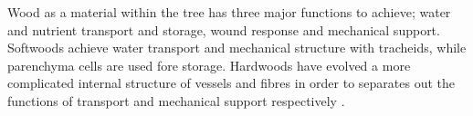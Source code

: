 Wood as a material within the tree has three major functions to achieve; water
and nutrient transport and storage, wound response and mechanical support. Softwoods
achieve water transport and mechanical structure with tracheids, while
parenchyma cells are used fore storage. Hardwoods have evolved a more
complicated internal structure of vessels and fibres in order to separates out
the functions of transport and mechanical support respectively \citep{walker1993primary}.